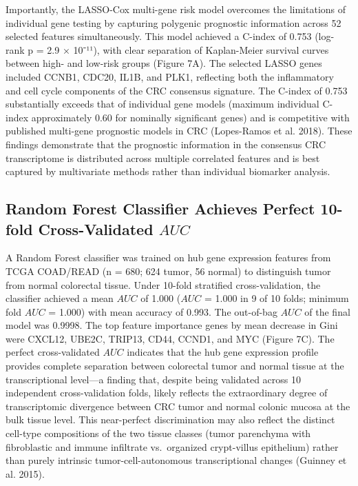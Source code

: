\documentclass[
  12pt,
]{article}
\begin{document}
Importantly, the LASSO-Cox multi-gene risk model overcomes the
limitations of individual gene testing by capturing polygenic prognostic
information across 52 selected features simultaneously. This model
achieved a C-index of 0.753 (log-rank p = 2.9 × 10⁻¹¹), with clear
separation of Kaplan-Meier survival curves between high- and low-risk
groups (Figure 7A). The selected LASSO genes included CCNB1, CDC20,
IL1B, and PLK1, reflecting both the inflammatory and cell cycle
components of the CRC consensus signature. The C-index of 0.753
substantially exceeds that of individual gene models (maximum individual
C-index approximately 0.60 for nominally significant genes) and is
competitive with published multi-gene prognostic models in CRC
(Lopes-Ramos et al. 2018). These findings demonstrate that the
prognostic information in the consensus CRC transcriptome is distributed
across multiple correlated features and is best captured by multivariate
methods rather than individual biomarker analysis.

\subsection{\texorpdfstring{Random Forest Classifier Achieves Perfect
10-fold Cross-Validated
\(AUC\)}{Random Forest Classifier Achieves Perfect 10-fold Cross-Validated AUC}}\label{random-forest-classifier-achieves-perfect-10-fold-cross-validated-auc}

A Random Forest classifier was trained on hub gene expression features
from TCGA COAD/READ (n = 680; 624 tumor, 56 normal) to distinguish tumor
from normal colorectal tissue. Under 10-fold stratified
cross-validation, the classifier achieved a mean \(AUC\) of 1.000
(\(AUC\) = 1.000 in 9 of 10 folds; minimum fold \(AUC\) = 1.000) with
mean accuracy of 0.993. The out-of-bag \(AUC\) of the final model was
0.9998. The top feature importance genes by mean decrease in Gini were
CXCL12, UBE2C, TRIP13, CD44, CCND1, and MYC (Figure 7C). The perfect
cross-validated \(AUC\) indicates that the hub gene expression profile
provides complete separation between colorectal tumor and normal tissue
at the transcriptional level---a finding that, despite being validated
across 10 independent cross-validation folds, likely reflects the
extraordinary degree of transcriptomic divergence between CRC tumor and
normal colonic mucosa at the bulk tissue level. This near-perfect
discrimination may also reflect the distinct cell-type compositions of
the two tissue classes (tumor parenchyma with fibroblastic and immune
infiltrate vs.~organized crypt-villus epithelium) rather than purely
intrinsic tumor-cell-autonomous transcriptional changes (Guinney et al.
2015).
\end{document}

